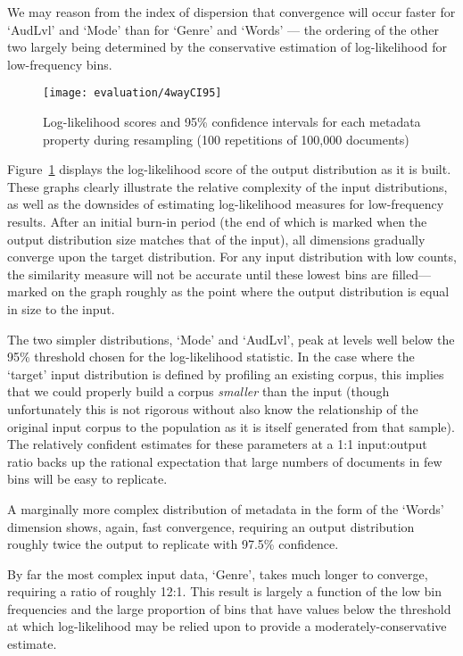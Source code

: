 We may reason from the index of dispersion that convergence will occur faster for `AudLvl' and `Mode' than for `Genre' and `Words' --- the ordering of the other two largely being determined by the conservative estimation of log-likelihood for low-frequency bins.


\begin{figure}[Ht]
    \centering
    \texttt{[image: evaluation/4wayCI95]}
    \caption{Log-likelihood scores and 95\% confidence intervals for each metadata property during resampling (100 repetitions of 100,000 documents)}
    \label{fig:evaluation:resampling:4wayCI95}
\end{figure}


Figure~\ref{fig:evaluation:resampling:4wayCI95} displays the log-likelihood score of the output distribution as it is built.  These graphs clearly illustrate the relative complexity of the input distributions, as well as the downsides of estimating log-likelihood measures for low-frequency results.  After an initial burn-in period (the end of which is marked when the output distribution size matches that of the input), all dimensions gradually converge upon the target distribution.  For any input distribution with low counts, the similarity measure will not be accurate until these lowest bins are filled---marked on the graph roughly as the point where the output distribution is equal in size to the input.%

The two simpler distributions, `Mode' and `AudLvl', peak at levels well below the 95\% threshold chosen for the log-likelihood statistic.  In the case where the `target' input distribution is defined by profiling an existing corpus, this implies that we could properly build a corpus \textit{smaller} than the input (though unfortunately this is not rigorous without also know the relationship of the original input corpus to the population as it is itself generated from that sample).  The relatively confident estimates for these parameters at a 1:1 input:output ratio backs up the rational expectation that large numbers of documents in few bins will be easy to replicate.

A marginally more complex distribution of metadata in the form of the `Words' dimension shows, again, fast convergence, requiring an output distribution roughly twice the output to replicate with 97.5\% confidence.

By far the most complex input data, `Genre', takes much longer to converge, requiring a ratio of roughly 12:1.  This result is largely a function of the low bin frequencies and the large proportion of bins that have values below the threshold at which log-likelihood may be relied upon to provide a moderately-conservative estimate.

